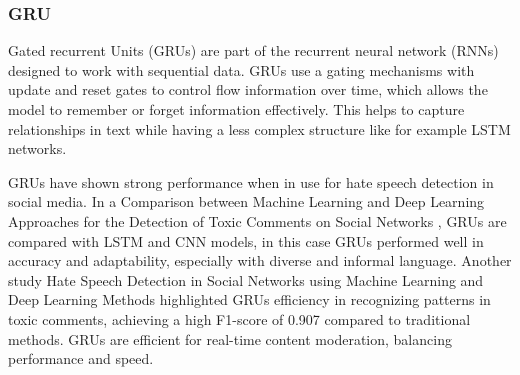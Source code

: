 \subsubsection{GRU}

\noindent
Gated recurrent Units (GRUs) are part of the recurrent neural network (RNNs) designed to work with sequential data. GRUs use a gating mechanisms with update and reset gates to control flow information over time, which allows the model to remember or forget information effectively. This helps to capture relationships in text while having a less complex structure like for example LSTM networks.

GRUs have shown strong performance when in use for hate speech detection in social media. In a Comparison between Machine Learning and Deep Learning Approaches for the Detection of Toxic Comments on Social Networks \citep{bonetti2023comparison}, GRUs are compared with LSTM and CNN models, in this case GRUs performed well in accuracy and adaptability, especially with diverse and informal language. Another study Hate Speech Detection in Social Networks using Machine Learning and Deep Learning Methods \citep{faisal2023hate} highlighted GRUs efficiency in recognizing patterns in toxic comments, achieving a high F1-score of 0.907 compared to traditional methods. GRUs are efficient for real-time content moderation, balancing performance and speed.